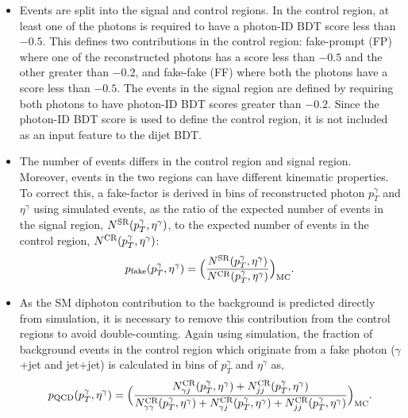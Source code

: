\begin{itemize}
    \item Events are split into the signal and control regions. In the control region, at least one of the photons is required to have a photon-ID BDT score less than $-0.5$. This defines two contributions in the control region: fake-prompt (FP) where one of the reconstructed photons has a score less than $-0.5$ and the other greater than $-0.2$, and fake-fake (FF) where both the photons have a score less than $-0.5$. The events in the signal region are defined by requiring both photons to have photon-ID BDT scores greater than $-0.2$. Since the photon-ID BDT score is used to define the control region, it is not included as an input feature to the dijet BDT.
    
    \item The number of events differs in the control region and signal region. Moreover, events in the two regions can have different kinematic properties. To correct this, a fake-factor is derived in bins of reconstructed photon $p_T^\gamma$ and $\eta^\gamma$ using simulated events, as the ratio of the expected number of events in the signal region, $N^{\rm{SR}}(p_T^\gamma,\eta^\gamma)$, to the expected number of events in the control region, $N^{\rm{CR}}(p_T^\gamma,\eta^\gamma)$:
    \begin{equation}
        p_{\rm{fake}}(p_T^\gamma,\eta^\gamma) = \Big(\frac{N^{\rm{SR}}(p_T^\gamma,\eta^\gamma)}{N^{\rm{CR}}(p_T^\gamma,\eta^\gamma)}\Big)_{\rm{MC}}.
    \end{equation}
    
    \item As the SM diphoton contribution to the background is predicted directly from simulation, it is necessary to remove this contribution from the control regions to avoid double-counting. Again using simulation, the fraction of background events in the control region which originate from a fake photon ($\gamma$+jet and jet+jet) is calculated in bins of $p_T^{\gamma}$ and $\eta^\gamma$ as,
    \begin{equation}
        p_{\rm{QCD}}(p_T^\gamma,\eta^\gamma) = \Big(\frac{N_{\gamma j}^{\rm{CR}}(p_T^\gamma,\eta^\gamma)+N_{jj}^{\rm{CR}}(p_T^\gamma,\eta^\gamma)}{N_{\gamma\gamma}^{\rm{CR}}(p_T^\gamma,\eta^\gamma)+N_{\gamma j}^{\rm{CR}}(p_T^\gamma,\eta^\gamma)+N_{jj}^{\rm{CR}}(p_T^\gamma,\eta^\gamma)}\Big)_{\rm{MC}}.
    \end{equation}    
    

\end{itemize}
